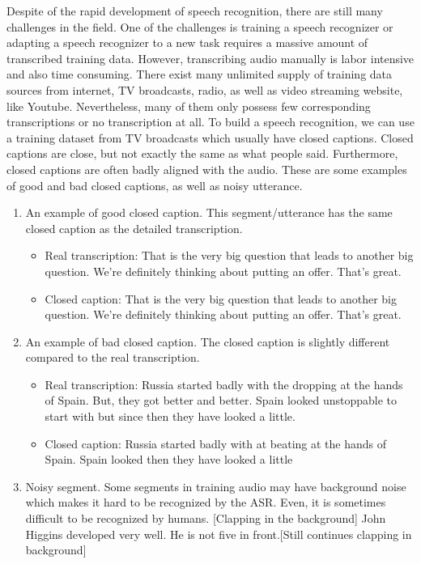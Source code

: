 Despite of the rapid development of speech recognition, there are still many challenges in the field. One of the challenges is training a speech recognizer or adapting a speech recognizer to a new task requires a massive amount of transcribed training data. However, transcribing audio manually is labor intensive and also time consuming. There exist many unlimited supply of training data sources from internet, TV broadcasts, radio, as well as video streaming website, like Youtube.  Nevertheless, many of them only possess few corresponding transcriptions or no transcription at all. To build a speech recognition, we can use a training dataset from TV broadcasts which usually have closed captions. Closed captions are close, but not exactly the same as what people said. Furthermore, closed captions are often badly aligned with the audio. These are some examples of good and bad closed captions,  as well as noisy utterance.
\begin{enumerate}
\item An example of good closed caption. This segment/utterance has the same closed caption as the detailed transcription.  
\begin{itemize}
\item Real transcription: \tab That is the very big question that leads to another big question. We're definitely thinking about putting an offer. That's great. 
\item Closed caption:  \tab That is the very big question that leads to another big question. We're definitely thinking about putting an offer. That's great.
\end{itemize}


\item An example of bad closed caption. The closed caption is slightly different compared to the real transcription.
\begin{itemize}
\item Real transcription: \tab Russia started badly with the dropping at the hands of Spain. But, they got better and better. Spain looked unstoppable to start with but since then they have looked a little.
\item Closed caption: \tab Russia started badly with at beating at the hands of Spain. Spain looked then they have looked a little
\end{itemize}


\item Noisy segment. Some segments in training audio may have background noise which makes it hard to be recognized by the ASR. Even, it is sometimes difficult to be recognized by humans.
[Clapping in the background] John Higgins developed very well. He is not five in front.[Still continues clapping in background]

\end{enumerate}

